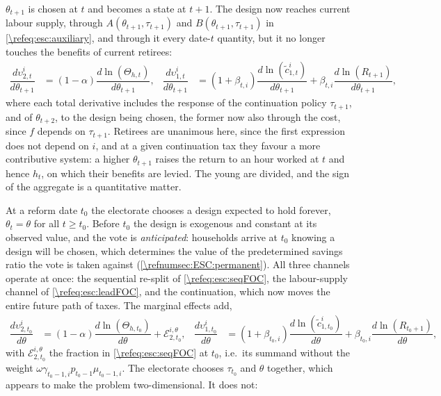  $\theta_{t+1}$ is chosen at $t$ and becomes a state at $t+1$. The design now reaches current labour supply, through $A(\theta_{t+1},\tau_{t+1})$ and $B(\theta_{t+1},\tau_{t+1})$ in \eqref{\refeq:esc:auxiliary}, and through it every date-$t$ quantity, but it no longer touches the benefits of current retirees:
\begin{align}\label{\refeq:esc:leadFOC}
    \dfrac{d\upsilon_{2,t}^i}{d\theta_{t+1}} &= (1-\alpha)\dfrac{d\ln\left(\Theta_{h,t}\right)}{d\theta_{t+1}}, &
    \dfrac{d\upsilon_{1,t}^i}{d\theta_{t+1}} &= (1+\beta_{t,i})\dfrac{d\ln\left(\tilde{c}_{1,t}^i\right)}{d\theta_{t+1}} + \beta_{t,i}\dfrac{d\ln\left(R_{t+1}\right)}{d\theta_{t+1}},
\end{align}
where each total derivative includes the response of the continuation policy $\tau_{t+1}$, and of $\theta_{t+2}$, to the design being chosen, the former now also through the cost, since $f$ depends on $\tau_{t+1}$. Retirees are unanimous here, since the first expression does not depend on $i$, and at a given continuation tax they favour a more contributive system: a higher $\theta_{t+1}$ raises the return to an hour worked at $t$ and hence $h_t$, on which their benefits are levied. The young are divided, and the sign of the aggregate is a quantitative matter.

 At a reform date $t_0$ the electorate chooses a design expected to hold forever, $\theta_t = \theta$ for all $t\geq t_0$. Before $t_0$ the design is exogenous and constant at its observed value, and the vote is \emph{anticipated}: households arrive at $t_0$ knowing a design will be chosen, which determines the value of the predetermined savings ratio the vote is taken against (\cref{\refnumsec:ESC:permanent}). All three channels operate at once: the sequential re-split of \eqref{\refeq:esc:seqFOC}, the labour-supply channel of \eqref{\refeq:esc:leadFOC}, and the continuation, which now moves the entire future path of taxes. The marginal effects add,
\begin{align}\label{\refeq:esc:permFOC}
    \dfrac{d\upsilon_{2,t_0}^i}{d\theta} &= (1-\alpha)\dfrac{d\ln\left(\Theta_{h,t_0}\right)}{d\theta} + \mathcal{E}_{2,t_0}^{i,\theta}, &
    \dfrac{d\upsilon_{1,t_0}^i}{d\theta} &= (1+\beta_{t_0,i})\dfrac{d\ln\left(\tilde{c}_{1,t_0}^i\right)}{d\theta} + \beta_{t_0,i}\dfrac{d\ln\left(R_{t_0+1}\right)}{d\theta},
\end{align}
with $\mathcal{E}_{2,t_0}^{i,\theta}$ the fraction in \eqref{\refeq:esc:seqFOC} at $t_0$, i.e.\ its summand without the weight $\omega\gamma_{t_0-1,i}p_{t_0-1}\mu_{t_0-1,i}$. The electorate chooses $\tau_{t_0}$ and $\theta$ together, which appears to make the problem two-dimensional. It does not:

